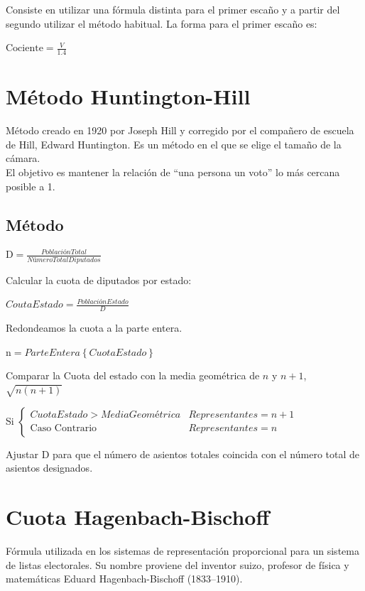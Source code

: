 \documentclass[12pt,a4paper,]{book}
\numberwithin{dummy}{section}
\theoremstyle{ocrenumbox}
\theoremstyle{blacknumex}
\theoremstyle{blacknumbox}
\theoremstyle{ocrenum}
\theoremstyle{ocrenum}
\begin{document}
Consiste en utilizar una fórmula distinta para el primer escaño y a
partir del segundo utilizar el método habitual. La forma para el primer
escaño es:

\(\textrm{Cociente} = \frac{V}{1.4}\)

\hypertarget{muxe9todo-huntington-hill}{%
\section{Método Huntington-Hill}\label{muxe9todo-huntington-hill}}

Método creado en 1920 por Joseph Hill y corregido por el compañero de
escuela de Hill, Edward Huntington. Es un método en el que se elige el
tamaño de la cámara.\\
El objetivo es mantener la relación de ``una persona un voto'' lo más
cercana posible a 1.

\hypertarget{muxe9todo}{%
\subsection{Método}\label{muxe9todo}}

\(\textrm{D} = \frac{Población Total}{NúmeroTotalDiputados}\)

Calcular la cuota de diputados por estado:

\(CoutaEstado = \frac{Población Estado}{D}\)

Redondeamos la cuota a la parte entera.

\(\textrm{n} = ParteEntera\left\{{Cuota Estado}\right\}\)

Comparar la Cuota del estado con la media geométrica de \(n\) y \(n+1\),
\(\sqrt{n(n+1)}\)

Si
\(\begin{cases}CuotaEstado>MediaGeométrica & Representantes = n+1\\\textrm{Caso Contrario} & Representantes = n\end{cases}\)

Ajustar D para que el número de asientos totales coincida con el número
total de asientos designados.

\hypertarget{cuota-hagenbach-bischoff}{%
\section{Cuota Hagenbach-Bischoff}\label{cuota-hagenbach-bischoff}}

Fórmula utilizada en los sistemas de representación proporcional para un
sistema de listas electorales. Su nombre proviene del inventor suizo,
profesor de física y matemáticas Eduard Hagenbach-Bischoff (1833--1910).
\end{document}
